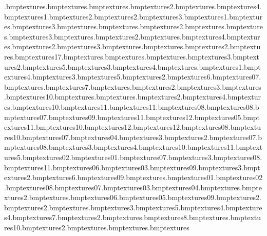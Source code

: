 \gramnut.bmp textures\gramhorn.bmp textures\record.bmp textures\gramarmcor.bmp textures\gramarmcor2.bmp textures\gramarm.bmp textures\pyratesign4.bmp textures\pyratesign1.bmp textures\curtainscreen2.bmp textures\pyratesignb2.bmp textures\pyratesign3.bmp textures\aquapyratesign1.bmp textures\teeth.bmp textures\treasurechestlock3.bmp textures\crateowoodlegs.bmp textures\crateocutlasses.bmp textures\crateofish2.bmp textures\crateofish.bmp textures\crateoeyepatch.bmp textures\crateobanana3.bmp textures\crateobanana.bmp textures\crateobanana2.bmp textures\curtainscreen.bmp textures\aquatable4.bmp textures\aquatable.bmp textures\aquatable2.bmp textures\aquatable3.bmp textures\tapend.bmp textures\stopbarrier.bmp textures\stopbarrier2.bmp textures\deckchairstrips.bmp textures\pyrateship17.bmp textures\hutwood.bmp textures\littlesandcas.bmp textures\targetblock.bmp textures\aquadock3.bmp textures\aquadock2.bmp textures\aquadock5.bmp textures\aquadecking3.bmp textures\aquadecking4.bmp textures\aquasandjoiner.bmp textures\aquapathpurp1.bmp textures\aquapathred4.bmp textures\aquapaths3.bmp textures\aquadecking5.bmp textures\aquasandjoiner2.bmp textures\aquadecking6.bmp textures\orangeextra07.bmp textures\aquapathredend.bmp textures\aquadecking7.bmp textures\aquapaths.bmp textures\aquapaths2.bmp textures\aquasidewalk3.bmp textures\aquasidewalk.bmp textures\orangeextra10.bmp textures\aquadock.bmp textures\waterposts.bmp textures\aquadecking2.bmp textures\aquasidewalk4.bmp textures\aquaseawall.bmp textures\orangersandsmall10.bmp textures\orangersandsmall11.bmp textures\orangeextra11.bmp textures\orangerock08.bmp textures\orangeextra08.bmp textures\orangeyelledge07.bmp textures\orangeyelledge09.bmp textures\orangerock11.bmp textures\orangeyelled12.bmp textures\orangerock05.bmp textures\orangeyelled11.bmp textures\orangerock10.bmp textures\orangeextra12.bmp textures\orangesandbase12.bmp textures\orangesandbase08.bmp textures\orangesandbase10.bmp textures\orangerock07.bmp textures\orangerock04.bmp textures\grill3.bmp textures\aquapathpurp2.bmp textures\orangesandbase07.bmp textures\orangeyelledge08.bmp textures\aquapathpurp3.bmp textures\aquapathpurp4.bmp textures\orangeyelled10.bmp textures\orangesandbase11.bmp textures\aquapathpurp5.bmp textures\orangerock02.bmp textures\orangerock01.bmp textures\orangesandbaser07.bmp textures\pyratecrate3.bmp textures\orangesandbaser08.bmp textures\orangeyelledge11.bmp textures\orangerock06.bmp textures\orangerock03.bmp textures\orangerock09.bmp textures\lifehut3.bmp textures\aquaplanks2.bmp textures\aquapathpurp6.bmp textures\orangesandbaser09.bmp textures\aquaplanks.bmp textures\slide01.bmp textures\slide02.bmp textures\slide08.bmp textures\slide07.bmp textures\slide03.bmp textures\slide04.bmp textures\entrance.bmp textures\shipjetty2.bmp textures\shipjetty.bmp textures\orangeextra06.bmp textures\orangeextra05.bmp textures\orangeextra09.bmp textures\lighthourails2.bmp textures\rowboatwood2.bmp textures\rowboatwood.bmp textures\rowboatwood3.bmp textures\rowboatwood5.bmp textures\rowboatwood4.bmp textures\lifehut4.bmp textures\rowboatwood7.bmp textures\waterposts2.bmp textures\aquapathpurpend.bmp textures\lifehut8.bmp textures\aquadecking.bmp textures\orangeyelledge10.bmp textures\aquaposttops2.bmp textures\aquaposttops.bmp textures\targetsand.bmp textures\